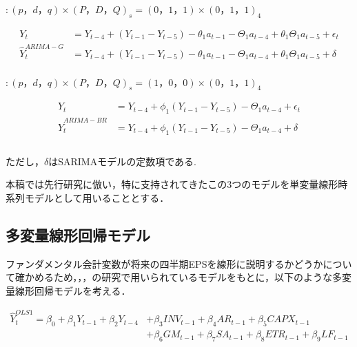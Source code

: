 \documentclass[a4paper，11pt]{jsarticle}
\begin{document}
\cite{griffin1977time} $: (p，d，q) \times (P，D，Q)_s = (0，1，1) \times (0，1，1)_4$

\begin{equation}
  \begin{split}
    Y_t &= Y_{t-4} + (Y_{t-1} - Y_{t-5}) - \theta_1a_{t-1} - \Theta_1a_{t-4} + \theta_1\Theta_1a_{t-5} + \epsilon_t \\
    \hat{Y}_t^{ARIMA-G} &= Y_{t-4} + (Y_{t-1} - Y_{t-5}) - \theta_1a_{t-1} - \Theta_1a_{t-4} + \theta_1\Theta_1a_{t-5} + \delta \\
  \end{split}
\end{equation}

\cite*{brown1979univariate} $: (p，d，q) \times (P，D，Q)_s = (1，0，0) \times (0，1，1)_4$

\begin{equation}
  \begin{split}    
    Y_t &= Y_{t-4} + \phi_1(Y_{t-1}-Y_{t-5}) - \Theta_1a_{t-4} + \epsilon_t \\
    \hat{Y}_t^{ARIMA-BR} &= Y_{t-4} + \phi_1(Y_{t-1}-Y_{t-5}) - \Theta_1a_{t-4} + \delta \\
    \\
  \end{split}
\end{equation}

ただし，$\delta$はSARIMAモデルの定数項である.

\noindent
本稿では先行研究に倣い，特に支持されてきたこの3つのモデルを単変量線形時系列モデルとして用いることとする．

\subsection{多変量線形回帰モデル}

ファンダメンタル会計変数が将来の四半期EPSを線形に説明するかどうかについて確かめるため，\cite*{lev1993fundamental}，\cite*{abarbanell1997fundamental}，\cite*{lorek1996multivariate}の研究で用いられているモデルをもとに，以下のような多変量線形回帰モデルを考える．

\begin{equation}
  \begin{split}
    \label{eq:ols1}
    \hat{Y}_t^{OLS1} = \beta_0 + \beta_1Y_{t-1} + \beta_2Y_{t-4} 
    &+ \beta_3INV_{t-1} + \beta_4AR_{t-1} + \beta_5CAPX_{t-1} \\
    &+ \beta_6GM_{t-1} + \beta_7SA_{t-1} + \beta_8ETR_{t-1} + \beta_9LF_{t-1} \\
  \end{split}
\end{equation}
\end{document}
